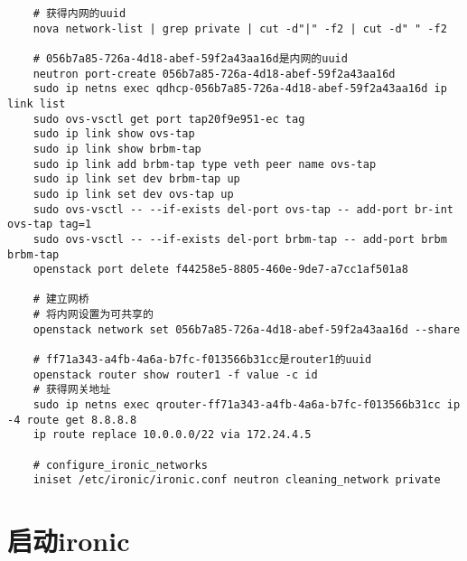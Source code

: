 \documentclass[a4paper,left=1.5cm,right=1.5cm,11pt]{article}
\begin{document}
	\begin{lstlisting}
	# 获得内网的uuid
	nova network-list | grep private | cut -d"|" -f2 | cut -d" " -f2

	# 056b7a85-726a-4d18-abef-59f2a43aa16d是内网的uuid
	neutron port-create 056b7a85-726a-4d18-abef-59f2a43aa16d
	sudo ip netns exec qdhcp-056b7a85-726a-4d18-abef-59f2a43aa16d ip link list
	sudo ovs-vsctl get port tap20f9e951-ec tag
	sudo ip link show ovs-tap
	sudo ip link show brbm-tap
	sudo ip link add brbm-tap type veth peer name ovs-tap
	sudo ip link set dev brbm-tap up
	sudo ip link set dev ovs-tap up
	sudo ovs-vsctl -- --if-exists del-port ovs-tap -- add-port br-int ovs-tap tag=1
	sudo ovs-vsctl -- --if-exists del-port brbm-tap -- add-port brbm brbm-tap
	openstack port delete f44258e5-8805-460e-9de7-a7cc1af501a8

	# 建立网桥
	# 将内网设置为可共享的
	openstack network set 056b7a85-726a-4d18-abef-59f2a43aa16d --share

	# ff71a343-a4fb-4a6a-b7fc-f013566b31cc是router1的uuid
	openstack router show router1 -f value -c id
	# 获得网关地址
	sudo ip netns exec qrouter-ff71a343-a4fb-4a6a-b7fc-f013566b31cc ip -4 route get 8.8.8.8
	ip route replace 10.0.0.0/22 via 172.24.4.5

	# configure_ironic_networks
	iniset /etc/ironic/ironic.conf neutron cleaning_network private
	\end{lstlisting}

\section{启动ironic}
\end{document}
